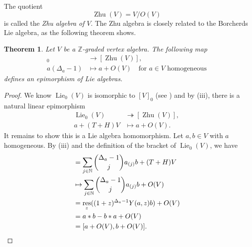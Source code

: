 \documentclass[a4paper, 12pt, reqno]{amsart}
\newtheorem{theorem}{Theorem}[section]
\theoremstyle{remark}
\DeclareMathOperator{\res}{res}
\DeclareMathOperator{\Lie}{Lie}
\DeclareMathOperator{\Zhu}{Zhu}
\begin{document}
The quotient
\begin{equation*}
  \Zhu(V) = V/O(V)
\end{equation*}
is called the \emph{Zhu algebra of $V$}.
The Zhu algebra is closely related to the Borcherds Lie algebra, as the following theorem shows.

\begin{theorem}
  \label{thr:36}
  Let $V$ be a $\mathbb{Z}$-graded vertex algebra.
  The following map
  \begin{align*}
    [V]_0 &\to [\Zhu(V)], \\
    a(\Delta_a - 1) &\mapsto a + O(V) \quad \text{for $a \in V$ homogeneous}
  \end{align*}
  defines an epimorphism of Lie algebras.
\end{theorem}

\begin{proof}
  We know $\Lie_0(V)$ is isomorphic to $[V]_0$ (see ) and by (iii), there is a natural linear epimorphism
  \begin{align*}
    \Lie_0(V) &\twoheadrightarrow [\Zhu(V)], \\
    a + (T + H)V &\mapsto a + O(V).
  \end{align*}
  It remains to show this is a Lie algebra homomorphism.
  Let $a, b \in V$ with $a$ homogeneous.
  By (iii) and the definition of the bracket of $\Lie_0(V)$, we have
  \begin{align*}
    [a + (T + H)V, b + (T + H)V] &= \sum_{j \in \mathbb{N}}\binom{\Delta_a - 1}{j}a_{(j)}b + (T + H)V \\
                                 &\mapsto \sum_{j \in \mathbb{N}}\binom{\Delta_a - 1}{j}a_{(j)}b + O(V) \\
                                 &= \res_z((1 + z)^{\Delta_a - 1}Y(a, z)b) + O(V) \\
                                 &= a*b - b*a + O(V) \\
                                 &= [a + O(V), b + O(V)]. \qedhere
  \end{align*}
\end{proof}
\end{document}
